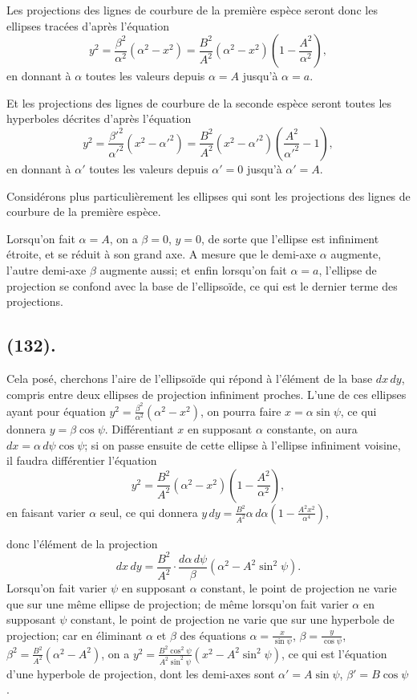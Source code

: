 \documentclass{article}
\begin{document}
Les projections des lignes de courbure de la première espèce seront donc les ellipses tracées d'après l'équation
\[ y^{2}=\frac{\beta^{2}}{\alpha^{2}}(\alpha^{2}-x^{2})=\frac{B^{2}}{A^{2}}(\alpha^{2}-x^{2})\left(1-\frac{A^{2}}{\alpha^{2}}\right), \]
en donnant à $\alpha$ toutes les valeurs depuis $\alpha=A$ jusqu'à $\alpha=a$.

Et les projections des lignes de courbure de la seconde espèce seront toutes les hyperboles décrites d'après l'équation
\[ y^{2}=\frac{\beta'^{2}}{\alpha'^{2}}(x^{2}-\alpha'^{2})=\frac{B^{2}}{A^{2}}(x^{2}-\alpha'^{2})\left(\frac{A^{2}}{\alpha'^{2}}-1\right), \]
en donnant à $\alpha'$ toutes les valeurs depuis $\alpha'=0$ jusqu'à $\alpha'=A$.

Considérons plus particulièrement les ellipses qui sont les projections des lignes de courbure de la première espèce.

Lorsqu'on fait $\alpha=A$, on a $\beta=0$, $y=0$, de sorte que l'ellipse est infiniment étroite, et se réduit à son grand axe. A mesure que le demi-axe $\alpha$ augmente, l'autre demi-axe $\beta$ augmente aussi; et enfin lorsqu'on fait $\alpha=a$, l'ellipse de projection se confond avec la base de l'ellipsoïde, ce qui est le dernier terme des projections.

\subsection*{(132).}

Cela posé, cherchons l'aire de l'ellipsoïde qui répond à l'élément de la base $dx\,dy$, compris entre deux ellipses de projection infiniment proches. L'une de ces ellipses ayant pour équation $y^{2}=\frac{\beta^{2}}{\alpha^{2}}(\alpha^{2}-x^{2})$, on pourra faire $x=\alpha\sin\psi$, ce qui donnera $y=\beta\cos\psi$. Différentiant $x$ en supposant $\alpha$ constante, on aura $dx=\alpha\,d\psi\cos\psi$; si on passe ensuite de cette ellipse à l'ellipse infiniment voisine, il faudra différentier l'équation
\[ y^{2}=\frac{B^{2}}{A^{2}}(\alpha^{2}-x^{2})\left(1-\frac{A^{2}}{\alpha^{2}}\right), \]
en faisant varier $\alpha$ seul, ce qui donnera $y\,dy=\frac{B^{2}}{A^{2}}\alpha\,d\alpha\left(1-\frac{A^{2}x^{2}}{\alpha^{4}}\right)$,

donc l'élément de la projection
\[ dx\,dy=\frac{B^{2}}{A^{2}}\cdot\frac{d\alpha\,d\psi}{\beta}(\alpha^{2}-A^{2}\sin^{2}\psi). \]
Lorsqu'on fait varier $\psi$ en supposant $\alpha$ constant, le point de projection ne varie que sur une même ellipse de projection; de même lorsqu'on fait varier $\alpha$ en supposant $\psi$ constant, le point de projection ne varie que sur une hyperbole de projection; car en éliminant $\alpha$ et $\beta$ des équations $\alpha=\frac{x}{\sin\psi}$, $\beta=\frac{y}{\cos\psi}$, $\beta^{2}=\frac{B^{2}}{A^{2}}(\alpha^{2}-A^{2})$, on a $y^{2}=\frac{B^{2}\cos^{2}\psi}{A^{2}\sin^{2}\psi}(x^{2}-A^{2}\sin^{2}\psi)$, ce qui est l'équation d'une hyperbole de projection, dont les demi-axes sont $\alpha'=A\sin\psi$, $\beta'=B\cos\psi$.
\end{document}
